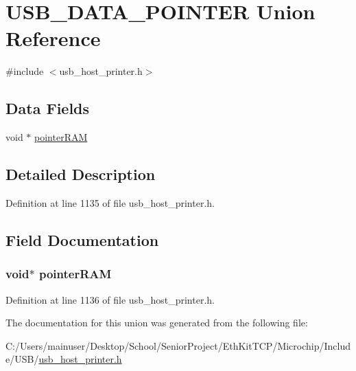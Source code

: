 \hypertarget{union_u_s_b___d_a_t_a___p_o_i_n_t_e_r}{}\section{U\+S\+B\+\_\+\+D\+A\+T\+A\+\_\+\+P\+O\+I\+N\+T\+E\+R Union Reference}
\label{union_u_s_b___d_a_t_a___p_o_i_n_t_e_r}


{\ttfamily \#include $<$usb\+\_\+host\+\_\+printer.\+h$>$}

\subsection*{Data Fields}
\begin{DoxyCompactItemize}
\item 
void $\ast$ \hyperlink{union_u_s_b___d_a_t_a___p_o_i_n_t_e_r_ae5ca98866bb3ced2e1779f903c07b462}{pointer\+R\+A\+M}
\end{DoxyCompactItemize}


\subsection{Detailed Description}


Definition at line 1135 of file usb\+\_\+host\+\_\+printer.\+h.



\subsection{Field Documentation}
\hypertarget{union_u_s_b___d_a_t_a___p_o_i_n_t_e_r_ae5ca98866bb3ced2e1779f903c07b462}{}
\subsubsection[{pointer\+R\+A\+M}]{\setlength{\rightskip}{0pt plus 5cm}void$\ast$ pointer\+R\+A\+M}\label{union_u_s_b___d_a_t_a___p_o_i_n_t_e_r_ae5ca98866bb3ced2e1779f903c07b462}


Definition at line 1136 of file usb\+\_\+host\+\_\+printer.\+h.



The documentation for this union was generated from the following file\+:\begin{DoxyCompactItemize}
\item 
C\+:/\+Users/mainuser/\+Desktop/\+School/\+Senior\+Project/\+Eth\+Kit\+T\+C\+P/\+Microchip/\+Include/\+U\+S\+B/\hyperlink{usb__host__printer_8h}{usb\+\_\+host\+\_\+printer.\+h}\end{DoxyCompactItemize}
